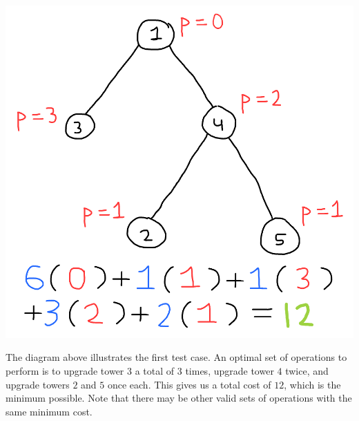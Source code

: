 \begin{center}
\includegraphics[scale=0.5]{Drawing-5.sketchpad.png}
\end{center}

The diagram above illustrates the first test case. An optimal set of operations to perform is to upgrade tower $3$ a total of $3$ times, upgrade tower $4$ twice, and upgrade towers $2$ and $5$ once each. This gives us a total cost of $12$, which is the minimum possible. Note that there may be other valid sets of operations with the same minimum cost.
